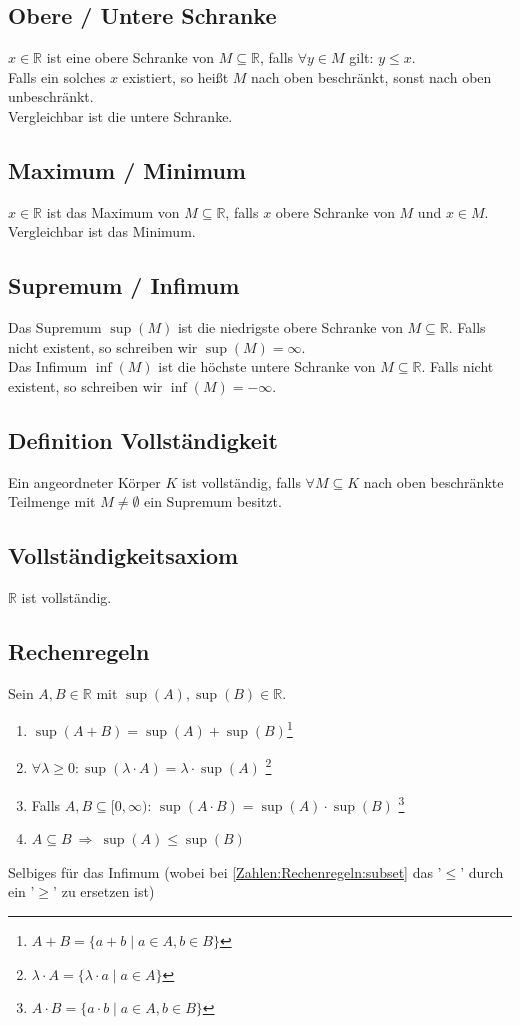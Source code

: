 \documentclass[halfparscip]{scrartcl}
\newcounter{subsection2}
\begin{document}
\subsection{Obere / Untere Schranke}
$x \in \mathbb{R}$ ist eine obere Schranke von $M \subseteq \mathbb{R}$, falls $\forall y \in M$ gilt: $y \leq x$.\\
Falls ein solches $x$ existiert, so heißt $M$ nach oben beschränkt, sonst nach oben unbeschränkt.\\
Vergleichbar ist die untere Schranke.

\subsection{Maximum / Minimum}
$x \in \mathbb{R}$ ist das Maximum von $M \subseteq \mathbb{R}$, falls $x$ obere Schranke von $M$ und $x \in M$.\\
Vergleichbar ist das Minimum.

\subsection{Supremum / Infimum}
Das Supremum $\sup(M)$ ist die niedrigste obere Schranke von $M \subseteq \mathbb{R}$. Falls nicht existent, so schreiben wir $\sup(M) = \infty$.\\
Das Infimum $\inf(M)$ ist die höchste untere Schranke von $M \subseteq \mathbb{R}$. Falls nicht existent, so schreiben wir $\inf(M) = -\infty$.

\subsection{Definition Vollständigkeit}
Ein angeordneter Körper $K$ ist vollständig, falls $\forall M \subseteq K$ nach oben beschränkte Teilmenge mit $M \neq \emptyset$ ein Supremum besitzt.

\subsection{Vollständigkeitsaxiom}
$\mathbb{R}$ ist vollständig.

\subsection{Rechenregeln}
Sein $A, B \in \mathbb{R}$ mit $\sup(A), \sup(B) \in \mathbb{R}$.
\begin{enumerate}
	\item $\sup(A + B) = \sup(A) + \sup (B)$\footnote{$A + B = \{a + b \mid a \in A, b \in B\}$}
	\item $\forall \lambda \geq 0: \sup(\lambda \cdot A) = \lambda \cdot \sup(A)$ \footnote{$\lambda \cdot A = \{\lambda \cdot a \mid a \in A\}$}
	\item Falls $A, B \subseteq [0,\infty)$: $\sup(A \cdot B) = \sup(A) \cdot \sup(B)$ \footnote{$A \cdot B = \{a \cdot b \mid a \in A, b \in B\}$}
	\item\label{Zahlen:Rechenregeln:subset} $A \subseteq B \ \Rightarrow \  \sup(A) \leq \sup(B)$
\end{enumerate}
Selbiges für das Infimum (wobei bei \autoref{Zahlen:Rechenregeln:subset} das '$\leq$' durch ein '$\geq$' zu ersetzen ist)
\end{document}
